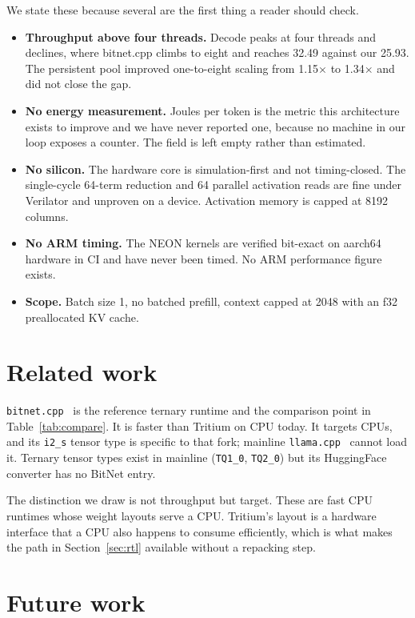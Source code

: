 \documentclass[10pt,twocolumn]{article}
\begin{document}
We state these because several are the first thing a reader should check.

\begin{itemize}
\item \textbf{Throughput above four threads.} Decode peaks at four threads and
      declines, where bitnet.cpp climbs to eight and reaches 32.49 against our
      25.93. The persistent pool improved one-to-eight scaling from
      1.15$\times$ to 1.34$\times$ and did not close the gap.
\item \textbf{No energy measurement.} Joules per token is the metric this
      architecture exists to improve and we have never reported one, because no
      machine in our loop exposes a counter. The field is left empty rather than
      estimated.
\item \textbf{No silicon.} The hardware core is simulation-first and not
      timing-closed. The single-cycle 64-term reduction and 64 parallel
      activation reads are fine under Verilator and unproven on a device.
      Activation memory is capped at 8192 columns.
\item \textbf{No ARM timing.} The NEON kernels are verified bit-exact on
      aarch64 hardware in CI and have never been timed. No ARM performance
      figure exists.
\item \textbf{Scope.} Batch size 1, no batched prefill, context capped at 2048
      with an f32 preallocated KV cache.
\end{itemize}

\section{Related work}

\texttt{bitnet.cpp}~\cite{bitnetcpp} is the reference ternary runtime and the
comparison point in Table~\ref{tab:compare}. It is faster than Tritium on CPU
today. It targets CPUs, and its \texttt{i2\_s} tensor type is specific to that
fork; mainline \texttt{llama.cpp}~\cite{llamacpp} cannot load it. Ternary tensor
types exist in mainline (\texttt{TQ1\_0}, \texttt{TQ2\_0}) but its HuggingFace
converter has no BitNet entry.

The distinction we draw is not throughput but target. These are fast CPU
runtimes whose weight layouts serve a CPU. Tritium's layout is a hardware
interface that a CPU also happens to consume efficiently, which is what makes
the path in Section~\ref{sec:rtl} available without a repacking step.

\section{Future work}
\end{document}
